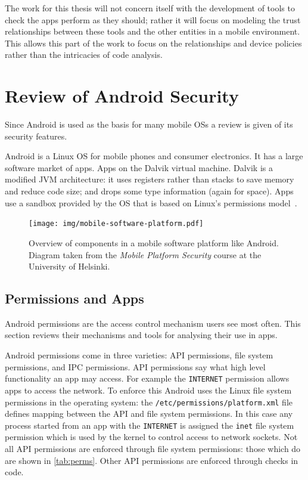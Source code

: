 \documentclass[a4paper,sfsidenotes]{%
  scrartcl%
}
\begin{document}
The work for this thesis will not concern itself with the development of tools
to check the apps perform as they should; rather it will focus on modeling the
trust relationships between these tools and the other entities in a mobile
environment.  This allows this part of the work to focus on the relationships
and device policies rather than the intricacies of code analysis.


\section{Review of Android Security}

Since Android is used as the basis for many mobile OSs a review is given of its
security features.

Android is a Linux OS for mobile phones and consumer electronics. It has a large
software market of apps. Apps on the Dalvik virtual machine.  Dalvik is a
modified JVM architecture: it uses registers rather than stacks to save memory
and reduce code size; and drops some type information (again for space).  Apps
use a sandbox provided by the OS that is based on Linux's permissions
model~\cite{Drake:2014uq}.

\begin{figure}
  \centering
  \texttt{[image: img/mobile-software-platform.pdf]}
  \caption[Overview of components in a mobile software platform like Android.]{Overview of components in a mobile software platform like Android.
    Diagram taken from the \emph{Mobile Platform Security} course at the
  University of Helsinki.}%
  \label{fig:mobilesoftwareplatform}
\end{figure}

\subsection{Permissions and Apps}

Android permissions are the access control mechanism users see most often.  This
section reviews their mechanisms and tools for analysing their use in apps.

Android permissions come in three varieties: API permissions, file system
permissions, and IPC permissions.  API permissions say what high level
functionality an app may access.  For example the \texttt{INTERNET} permission
allows apps to access the network.  To enforce this Android uses the
Linux file system permissions in the operating system: the
\texttt{/etc/permissions/platform.xml} file defines mapping between the API
and file system permissions.  In this case any process started from an app with
the \texttt{INTERNET} is assigned the \texttt{inet} file system permission which
is used by the kernel to control access to network sockets.  Not all API
permissions are enforced through file system permissions: those which do are
shown in \autoref{tab:perms}.  Other API permissions are enforced through
checks in code.  
\end{document}
